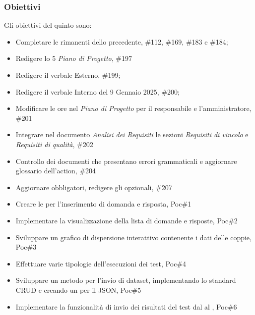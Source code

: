 \subsubsection{Obiettivi}
Gli obiettivi del quinto  sono:
\begin{itemize}
    \item Completare le  rimanenti dello  precedente,  \#112, \#169, \#183 e \#184;
    \item Redigere lo  5 \textit{Piano di Progetto},  \#197
    \item Redigere il verbale Esterno,  \#199;
    \item Redigere il verbale Interno del 9 Gennaio 2025,  \#200;
    \item Modificare le ore nel \textit{Piano di Progetto} per il responsabile e l’amministratore,  \#201
    \item Integrare nel documento \textit{Analisi dei Requisiti} le sezioni \textit{Requisiti di vincolo} e \textit{Requisiti di qualità},  \#202
    \item Controllo dei documenti che presentano errori grammaticali e aggiornare glossario dell'action,  \#204
    \item Aggiornare  obbligatori, redigere gli  opzionali,  \#207
    \item Creare le  per l'inserimento di domanda e risposta,  Poc\#1
    \item Implementare la visualizzazione della lista di domande e risposte,  Poc\#2
    \item Sviluppare un grafico di dispersione interattivo contenente i dati delle coppie,  Poc\#3
    \item Effettuare varie tipologie dell'esecuzioni dei test,  Poc\#4
    \item Sviluppare un metodo per l’invio di dataset, implementando lo standard CRUD e creando un  per il JSON,  Poc\#5
    \item Implementare la funzionalità di invio dei risultati del test dal  al ,  Poc\#6
\end{itemize}